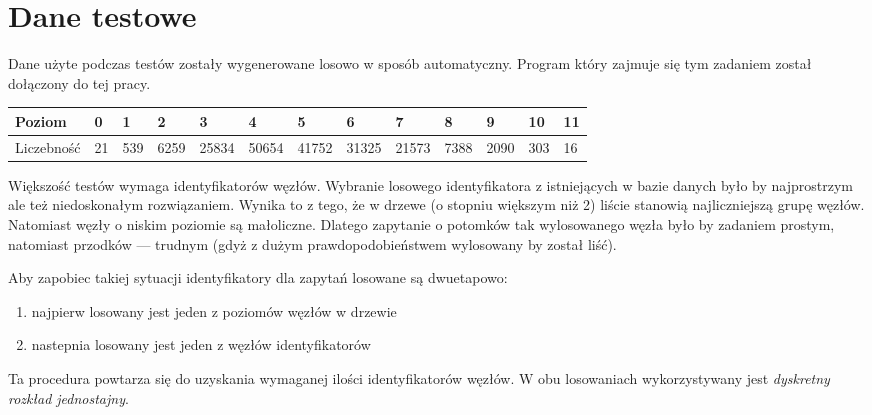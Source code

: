 

% 



\section{Dane testowe}

Dane użyte podczas testów zostały wygenerowane losowo w sposób automatyczny. 
Program który zajmuje się tym zadaniem został dołączony do tej pracy.


\begin{tabular}{|l|l@{ }l@{ }l@{ }l@{ }l@{ }l@{ }l@{ }l@{ }l@{ }l@{ }l@{ }l@{ }|}
\hline
Poziom     & 0      & 1     & 2     & 3     & 4     & 5     & 6     & 7     & 8     & 9     & 10    & 11 \\
\hline
Liczebność & 21     & 539   & 6259  & 25834 & 50654 & 41752 & 31325 & 21573 & 7388  & 2090  & 303   & 16 \\
\hline
\end{tabular}


Większość testów wymaga identyfikatorów węzłów. 
Wybranie losowego identyfikatora z istniejących w bazie danych było by najprostrzym 
ale też niedoskonałym rozwiązaniem.
Wynika to z tego, że w drzewe (o stopniu większym niż 2) 
liście stanowią najliczniejszą grupę węzłów.
Natomiast węzły o niskim poziomie są małoliczne.
Dlatego zapytanie o potomków tak wylosowanego węzła było by zadaniem prostym, natomiast przodków --- trudnym (gdyż z dużym prawdopodobieństwem wylosowany by został liść).

Aby zapobiec takiej sytuacji identyfikatory dla zapytań losowane są dwuetapowo:
\begin{enumerate}
 \item najpierw losowany jest jeden z poziomów węzłów w drzewie
 \item nastepnia losowany jest jeden z węzłów identyfikatorów
\end{enumerate}
Ta procedura powtarza się do uzyskania wymaganej ilości identyfikatorów węzłów. 
W obu losowaniach wykorzystywany jest \emph{dyskretny rozkład jednostajny}. 





